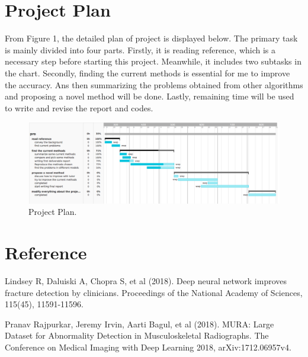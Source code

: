 \documentclass[12pt,oneside,a4paper]{article}
\begin{document}
\section{Project Plan}
From Figure 1, the detailed plan of project is displayed below. The primary task is mainly divided into four parts. Firstly, it is reading reference, which is a necessary step before starting this project. Meanwhile, it includes two subtasks in the chart. Secondly, finding the current methods is essential for me to improve the accuracy. Ans then summarizing the problems obtained from other algorithms and proposing a novel method will be done. Lastly, remaining time will be used to write and revise the report and codes.
\begin{figure}
\begin{center}
\includegraphics[width=1\columnwidth]{images/TaskGantt.png}
\caption{Project Plan.}
\end{center}
\end{figure}





\section{Reference}



Lindsey  R,  Daluiski  A,  Chopra  S,  et al  (2018).  Deep  neural  network  improves fracture  detection  by  clinicians.  Proceedings  of  the  National  Academy  of Sciences, 115(45), 11591-11596.  

Pranav Rajpurkar, Jeremy Irvin, Aarti Bagul, et al (2018). MURA: Large Dataset for Abnormality Detection in Musculoskeletal Radiographs. The Conference on Medical Imaging with Deep Learning 2018, arXiv:1712.06957v4. 
\end{document}
